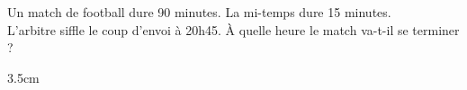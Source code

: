 \documentclass[a4paper]{book}
\begin{document}
    \begin{exemple}
        Un match de football dure 90 minutes. La mi-temps dure 15 minutes. \\
        L'arbitre siffle le coup d'envoi à 20h45. À quelle heure le match va-t-il se terminer ?
        \begin{ZoneReponse}{3.5cm}
        \end{ZoneReponse}
    \end{exemple}
\end{document}
